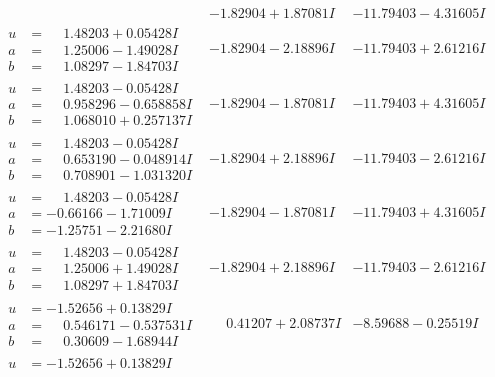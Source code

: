 \documentclass[1p]{elsarticle_modified}
\theoremstyle{definition}
\begin{document}
$$\begin{array}{c|c|c}
 & -1.82904 + 1.87081 I & -11.79403 - 4.31605 I \\ \hline\begin{aligned}
u &= \phantom{-}1.48203 + 0.05428 I \\
a &= \phantom{-}1.25006 - 1.49028 I \\
b &= \phantom{-}1.08297 - 1.84703 I\end{aligned}
 & -1.82904 - 2.18896 I & -11.79403 + 2.61216 I \\ \hline\begin{aligned}
u &= \phantom{-}1.48203 - 0.05428 I \\
a &= \phantom{-}0.958296 - 0.658858 I \\
b &= \phantom{-}1.068010 + 0.257137 I\end{aligned}
 & -1.82904 - 1.87081 I & -11.79403 + 4.31605 I \\ \hline\begin{aligned}
u &= \phantom{-}1.48203 - 0.05428 I \\
a &= \phantom{-}0.653190 - 0.048914 I \\
b &= \phantom{-}0.708901 - 1.031320 I\end{aligned}
 & -1.82904 + 2.18896 I & -11.79403 - 2.61216 I \\ \hline\begin{aligned}
u &= \phantom{-}1.48203 - 0.05428 I \\
a &= -0.66166 - 1.71009 I \\
b &= -1.25751 - 2.21680 I\end{aligned}
 & -1.82904 - 1.87081 I & -11.79403 + 4.31605 I \\ \hline\begin{aligned}
u &= \phantom{-}1.48203 - 0.05428 I \\
a &= \phantom{-}1.25006 + 1.49028 I \\
b &= \phantom{-}1.08297 + 1.84703 I\end{aligned}
 & -1.82904 + 2.18896 I & -11.79403 - 2.61216 I \\ \hline\begin{aligned}
u &= -1.52656 + 0.13829 I \\
a &= \phantom{-}0.546171 - 0.537531 I \\
b &= \phantom{-}0.30609 - 1.68944 I\end{aligned}
 & \phantom{-}0.41207 + 2.08737 I & -8.59688 - 0.25519 I \\ \hline\begin{aligned}
u &= -1.52656 + 0.13829 I \\

\end{aligned}
\end{array}$$
\end{document}
